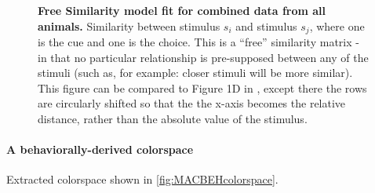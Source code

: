 \begin{figure}
    \centering
    \begin{subfigure}[b]{0.49\textwidth}
         \centering
         \caption{}
         
         \label{fig:SimilarityMatrixCombined}
    \end{subfigure}
    \hfill
    \begin{subfigure}[b]{0.49\textwidth}
         \centering
         \caption{}
         
         \label{fig:SimilarityMatrixCombinedRemapOnly}
    \end{subfigure}
    \caption{\textbf{Free Similarity model fit for combined data from all animals.}
    Similarity between stimulus $s_i$ and stimulus $s_j$, where one is the cue and one is the choice. This is a ``free'' similarity matrix - in that no particular relationship is pre-supposed between any of the stimuli (such as, for example: closer stimuli will be more similar). This figure can be compared to Figure 1D in \cite{schurgin_psychophysical_2020}, except there the rows are circularly shifted so that the the x-axis becomes the relative distance, rather than the absolute value of the stimulus. %
    } 
    \label{fig:TCCOutput}
\end{figure}

\paragraph{A behaviorally-derived colorspace}

Extracted colorspace shown in \autoref{fig:MACBEHcolorspace}.

